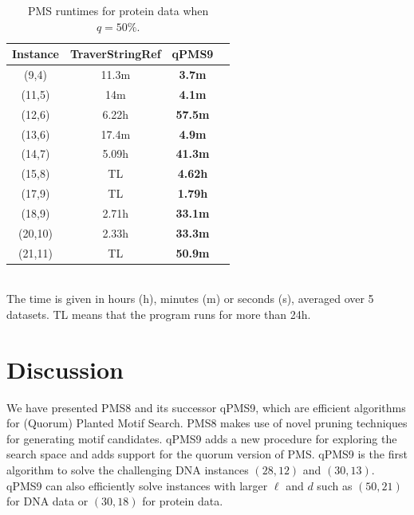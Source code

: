 \begin{table}
\caption{
PMS runtimes for protein data when $q=50\%$.}
\label{timePmsProteinq50}
\begin{tabular}{| c | c | c | c |}
\hline
Instance & TraverStringRef & qPMS9\\
\hline
(9,4) & 11.3m & \textbf{3.7m}\\
\hline
(11,5) & 14m & \textbf{4.1m}\\
\hline
(12,6) & 6.22h & \textbf{57.5m}\\
\hline
(13,6) & 17.4m & \textbf{4.9m}\\
\hline
(14,7) & 5.09h & \textbf{41.3m}\\
\hline
(15,8) & TL & \textbf{4.62h}\\
\hline
(17,9) & TL & \textbf{1.79h}\\
\hline
(18,9) & 2.71h & \textbf{33.1m}\\
\hline
(20,10) & 2.33h & \textbf{33.3m}\\
\hline
(21,11) & TL & \textbf{50.9m}\\
\hline
\end{tabular}\\
 The time is given in
hours (h), minutes (m) or seconds (s), averaged over 5
datasets. TL means that the program runs for more than 24h.
\end{table}

\section{Discussion}
We have presented PMS8 and its successor qPMS9, which are efficient algorithms
for (Quorum) Planted Motif Search. PMS8 makes use of novel pruning
techniques for generating motif candidates. qPMS9 adds a new
procedure for exploring the search space and adds support for the quorum
version of PMS. qPMS9 is the first algorithm to solve the challenging DNA
instances $(28,12)$ and $(30,13)$. qPMS9 can
also efficiently solve instances with larger $\ell$ and $d$ such
as $(50,21)$ for DNA data or $(30,18)$ for protein data.

